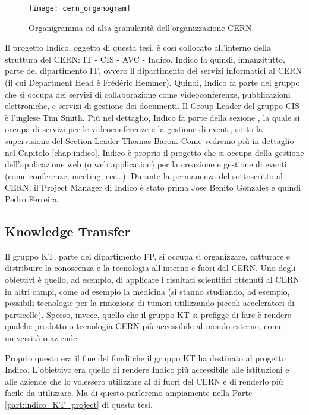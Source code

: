 			\begin{figure}[h!]
				\begin{center}
					\texttt{[image: cern\_organogram]}
				\end{center}
				\caption[Organigramma del CERN]{Organigramma ad alta granularità dell'organizzazione CERN.}
				\label{fig:cern_organogram}
			\end{figure}
			
			Il progetto Indico, oggetto di questa tesi, è così collocato all'interno della struttura del \ac{CERN}: \ac{IT} - \acs{CIS} - \acs{AVC} - Indico. Indico fa quindi, innanzitutto, parte del dipartimento \ac{IT}, ovvero il dipartimento dei servizi informatici al \ac{CERN} (il cui Department Head è Frédéric Hemmer). Quindi, Indico fa parte del gruppo  che si occupa dei servizi di collaborazione come videoconferenze, pubblicazioni elettroniche, e servizi di gestione dei documenti. Il Group Leader del gruppo \ac{CIS} è l'inglese Tim Smith. Più nel dettaglio, Indico fa parte della sezione , la quale si occupa di servizi per le videoconferenze e la gestione di eventi, sotto la supervisione del Section Leader Thomas Baron. Come vedremo più in dettaglio nel Capitolo \ref{chap:indico}, Indico è proprio il progetto che si occupa della gestione dell'applicazione web (o web application) per la creazione e gestione di eventi (come conferenze, meeting, ecc\dots). Durante la permanenza del sottoscritto al \ac{CERN}, il Project Manager di Indico è stato prima Jose Benito Gonzales e quindi Pedro Ferreira.
		
		\subsection{Knowledge Transfer} \label{subsec:C;l;KT}
		
			Il gruppo \ac{KT}, parte del dipartimento \ac{FP}, si occupa si organizzare, catturare e distribuire la conoscenza e la tecnologia all'interno e fuori dal \ac{CERN}. Uno degli obiettivi è quello, ad esempio, di applicare i risultati scientifici ottenuti al \ac{CERN} in altri campi, come ad esempio la medicina (si stanno studiando, ad esempio, possibili tecnologie per la rimozione di tumori utilizzando piccoli acceleratori di particelle). Spesso, invece, quello che il gruppo \ac{KT} si prefigge di fare è rendere qualche prodotto o tecnologia \ac{CERN} più accessibile al mondo esterno, come università o aziende.
			
			Proprio questo era il fine dei fondi che il gruppo \ac{KT} ha destinato al progetto Indico. L'obiettivo era quello di rendere Indico più accessibile alle istituzioni e alle aziende che lo volessero utilizzare al di fuori del \ac{CERN} e di renderlo più facile da utilizzare. Ma di questo parleremo ampiamente nella Parte \ref{part:indico_KT_project} di questa tesi.
